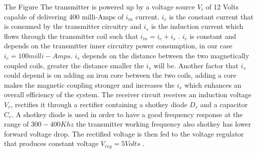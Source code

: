 
The Figure %
The transmitter is powered up by a voltage source $V_i$ of 12 Volts capable of delivering 400 milli-Amps of $i_{in}$ current. $i_c$ is the constant current that is consumed by the transmitter circuitry and $i_s$ is the induction current which flows through the transmitter coil such that $i_{in} = i_c + i_s$ . $i_c$ is constant and depends on the transmitter inner circuitry power consumption, in our case $i_c = 100 milli-Amps $. $i_s$ depends on the distance between the two magnetically coupled coils, greater the distance smaller the $i_s$ will be. Another factor that $i_s$ could depend is on adding an iron core between the two coils, adding a core makes the magnetic coupling stronger and increases the $i_s$ which enhances an overall efficiency of the system.
The receiver circuit receives an induction voltage $V_r$, rectifies it through a rectifier containing a shotkey diode $D_r$ and a capacitor $C_r$. A shotkey diode is used in order to have a good frequency response at the range of $ 300-400 Khz$ the transmitter working frequency also shotkey has lower forward voltage drop. The rectified voltage is then fed to the voltage regulator that produces constant voltage $V_{reg} = 5 Volts$ .


